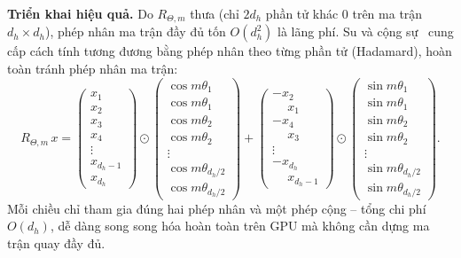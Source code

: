 \textbf{Triển khai hiệu quả.}
Do $R_{\Theta,m}$ thưa (chỉ $2d_h$ phần tử khác 0 trên ma trận $d_h \times d_h$), phép nhân
ma trận đầy đủ tốn $O(d_h^2)$ là lãng phí. Su và cộng sự~\cite{su2023roformer} cung cấp
cách tính tương đương bằng phép nhân theo từng phần tử (Hadamard), hoàn toàn tránh phép
nhân ma trận:
\begin{equation}
  \label{eq:rope-efficient}
  R_{\Theta,m}\,x =
  \begin{pmatrix} x_1 \\ x_2 \\ x_3 \\ x_4 \\ \vdots \\ x_{d_h-1} \\ x_{d_h}
  \end{pmatrix}
  \odot
  \begin{pmatrix} \cos m\theta_1 \\ \cos m\theta_1 \\ \cos m\theta_2 \\ \cos m\theta_2
    \\ \vdots \\ \cos m\theta_{d_h/2} \\ \cos m\theta_{d_h/2}
  \end{pmatrix}
  +
  \begin{pmatrix} -x_2 \\ \phantom{-}x_1 \\ -x_4 \\ \phantom{-}x_3
    \\ \vdots \\ -x_{d_h} \\ \phantom{-}x_{d_h-1}
  \end{pmatrix}
  \odot
  \begin{pmatrix} \sin m\theta_1 \\ \sin m\theta_1 \\ \sin m\theta_2 \\ \sin m\theta_2
    \\ \vdots \\ \sin m\theta_{d_h/2} \\ \sin m\theta_{d_h/2}
  \end{pmatrix}.
\end{equation}
Mỗi chiều chỉ tham gia đúng hai phép nhân và một phép cộng -- tổng chi phí $O(d_h)$, dễ
dàng song song hóa hoàn toàn trên GPU mà không cần dựng ma trận quay đầy đủ.

